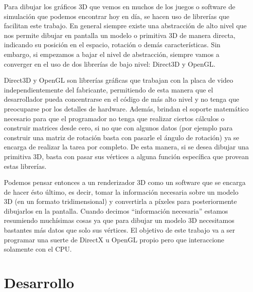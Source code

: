 \documentclass[a4paper]{article}
\begin{document}
Para dibujar los gráficos 3D que vemos en muchos de los juegos o software de simulación que podemos encontrar hoy en día, se hacen uso de librerías que facilitan este trabajo. En general siempre existe una abstracción de alto nivel que nos permite dibujar en pantalla un modelo o primitiva 3D de manera directa, indicando su posición en el espacio, rotación o demás características. Sin embargo, si empezamos a bajar el nivel de abstracción, siempre vamos a converger en el uso de dos librerías de bajo nivel: Direct3D y OpenGL.
\par Direct3D y OpenGL son librerías gráficas que trabajan con la placa de video independientemente del fabricante, permitiendo de esta manera que el desarrollador pueda concentrarse en el código de más alto nivel y no tenga que preocuparse por los detalles de hardware. Además, brindan el soporte matemático necesario para que el programador no tenga que realizar ciertos cálculos o construir matrices desde cero, si no que con algunos datos (por ejemplo para construir una matriz de rotación basta con pasarle el ángulo de rotación) ya se encarga de realizar la tarea por completo. De esta manera, si se desea dibujar una primitiva 3D, basta con pasar sus vértices a alguna función específica que provean estas librerías.
\par Podemos pensar entonces a un renderizador 3D como un software que se encarga de hacer ésto último, es decir, tomar la información necesaria sobre un modelo 3D (en un formato tridimensional) y convertirla a píxeles para posteriormente dibujarlos en la pantalla. Cuando decimos ``información necesaria'' estamos resumiendo muchísimas cosas ya que para dibujar un modelo 3D necesitamos bastantes más datos que solo sus vértices. El objetivo de este trabajo va a ser programar una suerte de DirectX u OpenGL propio pero que interaccione solamente con el CPU.


\section{Desarrollo}
\end{document}
